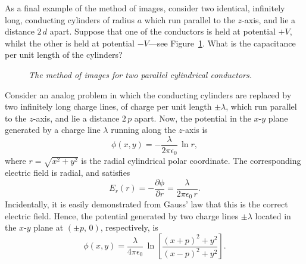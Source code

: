 As a final example of the method of images, consider two identical, infinitely
long,  conducting cylinders of radius $a$ which run parallel to the
$z$-axis, and lie a distance $2\,d$ apart. Suppose that one of the conductors
is held at potential $+V$, whilst the other is held at potential $-V$---see Figure~\ref{fimage3}. What is the capacitance per unit length of the cylinders?
\begin{figure}
\epsfysize=1.75in
\centerline{}
\caption{\em The method of images for two parallel cylindrical conductors.}\label{fimage3}
\end{figure}

Consider an analog problem in which the conducting cylinders are replaced by
two infinitely long charge lines, of charge per unit length $\pm\lambda$,
which run parallel to the $z$-axis, and lie a distance $2\,p$ apart. Now,
 the potential in the $x$-$y$ plane
generated by a charge line $\lambda$ running along the $z$-axis
is
\begin{equation}
\phi(x,y) = -\frac{\lambda}{2\pi\epsilon_0}\,\ln r,
\end{equation}
where $r=\sqrt{x^2+y^2}$ is the radial cylindrical polar coordinate.
The corresponding electric field is radial, and satisfies
\begin{equation}
E_r(r) = -\frac{\partial\phi}{\partial r} = \frac{\lambda}{2\pi\epsilon_0\,r}.
\end{equation}
Incidentally, it is easily demonstrated from Gauss' law that this is the correct electric field. Hence,  the potential generated by two  charge lines $\pm\lambda$ located in the $x$-$y$ plane at $(\pm p,\,0)$, respectively,  is
\begin{equation}\label{e4.1655x}
\phi(x,y) = \frac{\lambda}{4\pi\epsilon_0}\,\ln\left[\frac{(x+p)^2+y^2}{(x-p)^2+y^2}\right].
\end{equation}

